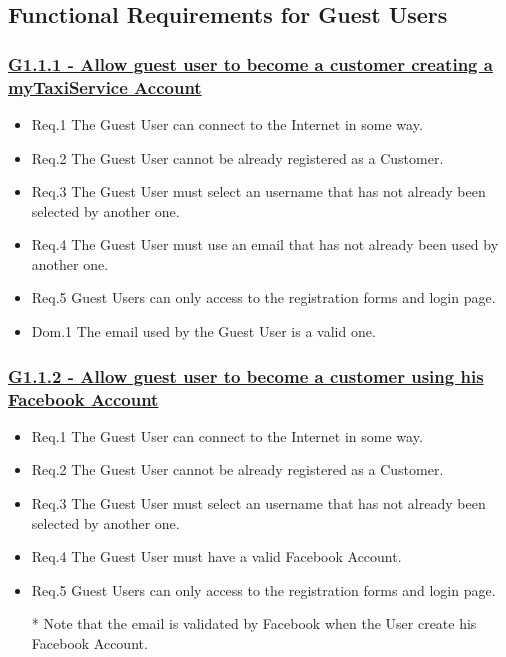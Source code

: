 \documentclass{report}
\begin{document}
		\subsection{Functional Requirements for Guest Users}

			\subsubsection{\lbrack \hyperref[sec:g1_1_1]{G1.1.1 - Allow guest user to become a customer creating a myTaxiService Account}\rbrack}

				\begin{itemize}
					\item \lbrack Req.1\rbrack \label{sec:fr1_g1_1_1} The Guest User can connect to the Internet in some way.
					\item \lbrack Req.2\rbrack \label{sec:fr2_g1_1_1} The Guest User cannot be already registered as a Customer.
					\item \lbrack Req.3\rbrack \label{sec:fr3_g1_1_1} The Guest User must select an username that has not already been selected by another one.
					\item \lbrack Req.4\rbrack \label{sec:fr4_g1_1_1} The Guest User must use an email that has not already been used by another one.
					\item \lbrack Req.5\rbrack \label{sec:fr5_g1_1_1} Guest Users can only access to the registration forms and login page.
					\item \lbrack Dom.1\rbrack \label{sec:da1_g1_1_1} The email used by the Guest User is a valid one.
				\end{itemize}

			\subsubsection{\lbrack \hyperref[sec:g1_1_2]{G1.1.2 - Allow guest user to become a customer using his Facebook Account}\rbrack}

				\begin{itemize}
					\item \lbrack Req.1\rbrack \label{sec:fr1_g1_1_2} The Guest User can connect to the Internet in some way.
					\item \lbrack Req.2\rbrack \label{sec:fr2_g1_1_2} The Guest User cannot be already registered as a Customer.
					\item \lbrack Req.3\rbrack \label{sec:fr3_g1_1_2} The Guest User must select an username that has not already been selected by another one.
					\item \lbrack Req.4\rbrack \label{sec:fr4_g1_1_2} The Guest User must have a valid Facebook Account.
					\item \lbrack Req.5\rbrack \label{sec:fr5_g1_1_2} Guest Users can only access to the registration forms and login page.
					
					* Note that the email is validated by Facebook when the User create his Facebook Account.
				\end{itemize}
\end{document}
